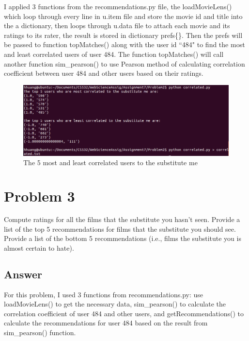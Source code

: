 \documentclass[12pt]{article}
\begin{document}
I applied 3 functions from the recommendations.py file, the loadMovieLens() which loop through every line in u.item file and store the movie id and title into the a dictionary, then loops through u.data file to attach each movie and its ratings to its rater, the result is stored in dictionary prefs\{\}. Then the prefs will be passed to function topMatches() along with the user id ``484" to find the most and least correlated users of user 484. The function topMatches() will call another function sim\_pearson() to use Pearson method of calculating correlation coefficient between user 484 and other users based on their ratings. 

\begin{figure}[h]
\centering
\includegraphics[width=6.5in]{correlated.png}
\caption{The 5 most and least correlated users to the substitute me}
\end{figure}



\section*{Problem 3}

Compute ratings for all the films that the substitute you
hasn't seen.  Provide a list of the top 5 recommendations for films
that the substitute you should see.  Provide a list of the bottom
5 recommendations (i.e., films the substitute you is almost certain
to hate).

\subsection*{Answer}

For this problem, I used 3 functions from recommendations.py: use loadMovieLens() to get the necessary data, sim\_pearson() to calculate the correlation coefficient of user 484 and other users, and getRecommendations() to calculate the recommendations for user 484 based on the result from sim\_pearson() function. 
\end{document}
